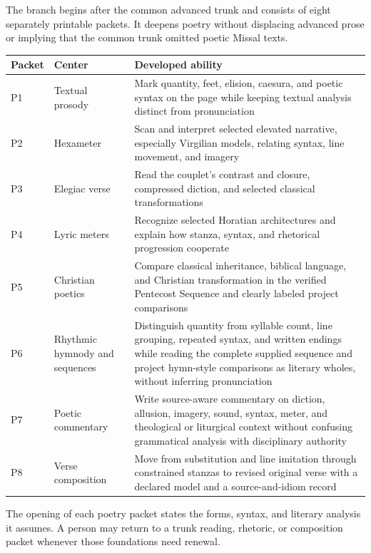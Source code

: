 The branch begins after the common advanced trunk and consists of eight
separately printable packets. It deepens poetry without displacing advanced
prose or implying that the common trunk omitted poetic Missal texts.

\begin{xltabular}{\linewidth}{@{}P{0.55in}P{2.0in}Y@{}}
  \toprule
  \textbf{Packet} & \textbf{Center} & \textbf{Developed ability} \\
  \midrule\endhead
  P1 & Textual prosody & Mark quantity, feet, elision, caesura, and poetic
  syntax on the page while keeping textual analysis distinct from
  pronunciation \\
  P2 & Hexameter & Scan and interpret selected elevated narrative, especially
  Virgilian models, relating syntax, line movement, and imagery \\
  P3 & Elegiac verse & Read the couplet's contrast and closure, compressed
  diction, and selected classical transformations \\
  P4 & Lyric meters & Recognize selected Horatian architectures and explain
  how stanza, syntax, and rhetorical progression cooperate \\
  P5 & Christian poetics & Compare classical inheritance, biblical language,
  and Christian transformation in the verified Pentecost Sequence and
  clearly labeled project comparisons \\
  P6 & Rhythmic hymnody and sequences & Distinguish quantity from syllable
  count, line grouping, repeated syntax, and written endings while reading the
  complete supplied sequence and project hymn-style comparisons as literary
  wholes, without inferring pronunciation \\
  P7 & Poetic commentary & Write source-aware commentary on diction, allusion,
  imagery, sound, syntax, meter, and theological or liturgical context without
  confusing grammatical analysis with disciplinary authority \\
  P8 & Verse composition & Move from substitution and line imitation through
  constrained stanzas to revised original verse with a declared model and a
  source-and-idiom record \\
  \bottomrule
\end{xltabular}

The opening of each poetry packet states the forms, syntax, and literary
analysis it assumes. A person may return to a trunk reading, rhetoric, or
composition packet whenever those foundations need renewal.

